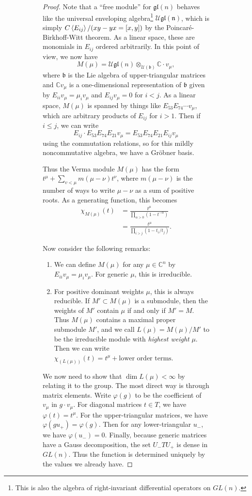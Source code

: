 \documentclass[leqno, openany]{memoir}
\theoremstyle{definition}
\theoremstyle{remark}
\theoremstyle{plain}
\theoremstyle{definition}
\theoremstyle{remark}
\newcommand{\C}{\mathbb{C}}
\newcommand{\mc}[1]{\mathcal{#1}}
\newcommand{\mf}[1]{\mathfrak{#1}}
\begin{document}
\begin{figure}[H]
\begin{figure}[H]
\begin{proof}
    Note that a ``free module'' for $\mf{gl}(n)$ behaves like the universal
    enveloping algebra\footnote{This is also the algebra of right-invariant
    differential operators on $GL(n)$.} $\mc{U} {\mf{gl(n)}}$, which is simply
    $C \ev{E_{ij}} / (xy-yx = [x,y])$ by the Poincar\'e-Birkhoff-Witt theorem.
    As a linear space, these are monomials in $E_{ij}$ ordered arbitrarily. In
    this point of view, we now have \[ M(\mu) = \mc{U} \mf{gl}(n)
    \otimes_{\mc{U}(\mf{b})} \C \cdot v_{\mu}, \] where $\mf{b}$ is the Lie
    algebra of upper-triangular matrices and $\C v_{\mu}$ is a one-dimensional
    representation of $\mf{b}$ given by $E_{ii} v_{\mu} = \mu_i v_{\mu}$ and
    $E_{ij} v_{\mu} = 0$ for $i < j$.  As a linear space, $M(\mu)$ is spanned
    by things like $E_{53} E_{74} \cdots v_{\mu}$, which are arbitrary products
    of $E_{ij}$ for $i > 1$. Then if $i \leq j$, we can write \[ E_{ij} \cdot
    E_{53} E_{74} E_{21} v_{\mu} = E_{53} E_{74} E_{21} E_{ij} v_{\mu} \] using
    the commutation relations, so for this mildly noncommutative algebra, we
    have a Gr\"obner basis.

    Thus the Verma module $M(\mu)$ has the form $t^{\mu} + \sum_{v < \mu}
    m(\mu-\nu) t^{\nu}$, where $m(\mu - \nu)$ is the number of ways to write
    $\mu - \nu$ as a sum of positive roots. As a generating function, this
    becomes \begin{align*} \chi_{M(\mu)}(t) &= \frac{t^{\mu}}{\prod_{\alpha >
    0} (1-t^{-\alpha})} \\ &= \frac{t^{\mu}}{\prod_{i>j} (1- t_i / t_j)}.
\end{align*}

    Now consider the following remarks: \begin{enumerate} \item We can define
        $M(\mu)$ for any $\mu \in \C^n$ by $E_{ii} v_{\mu} = \mu_i v_{\mu}$.
        For generic $\mu$, this is irreducible.  \item For positive dominant
        weights $\mu$, this is always reducible. If $M' \subset M(\mu)$ is a
        submodule, then the weights of $M'$ contain $\mu$ if and only if $M' =
        M$. Thus $M(\mu)$ contains a maximal proper submodule $M'$, and we call
        $L(\mu) = M(\mu) / M'$ to be the irreducible module with
        \textit{highest weight}  $\mu$. Then we can write $\chi_{(L(\mu))}(t) =
        t^{\mu} + \text{lower order terms}$.  \end{enumerate} We now need to
        show that $\dim L(\mu) < \infty$ by relating it to the group. The most
        direct way is through matrix elements. Write $\varphi(g)$ to be the
        coefficient of $v_{\mu}$ in $g \cdot v_{\mu}$. For diagonal matrices $t
        \in T$, we have $\varphi(t) = t^{\mu}$. For the upper-triangular
        matrices, we have $\varphi(gu_+) = \varphi(g)$. Then for any
        lower-triangular $u_-$, we have $\varphi(u_-) = 0$. Finally, because
        generic matrices have a Gauss decomposition, the set $U_- T U_+$ is
        dense in $GL(n)$. Thus the function is determined uniquely by the
        values we already have.


\end{proof}
\end{figure}
\end{figure}
\end{document}
